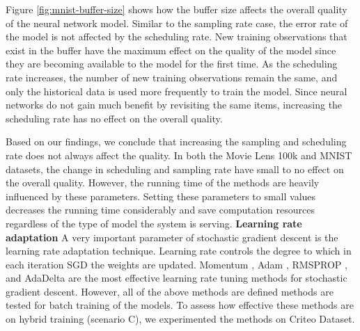 \documentclass[10pt,conference,letterpaper]{IEEEtran}
\begin{document}
Figure \ref{fig:mnist-buffer-size} shows how the buffer size affects the overall quality of the neural network model.
Similar to the sampling rate case, the error rate of the model is not affected by the scheduling rate.
New training observations that exist in the buffer have the maximum effect on the quality of the model since they are becoming available to the model for the first time.
As the scheduling rate increases, the number of new training observations remain the same, and only the historical data is used more frequently to train the model.
Since neural networks do not gain much benefit by revisiting the same items, increasing the scheduling rate has no effect on the overall quality.

Based on our findings, we conclude that increasing the sampling and scheduling rate does not always affect the quality.
In both the Movie Lens 100k and MNIST datasets, the change in scheduling and sampling rate have small to no effect on the overall quality.
However, the running time of the methods are heavily influenced by these parameters.
Setting these parameters to small values decreases the running time considerably and save computation resources regardless of the type of model the system is serving.
\textbf{Learning rate adaptation}
A very important parameter of stochastic gradient descent is the learning rate adaptation technique. 
Learning rate controls the degree to which in each iteration SGD the weights are updated.
Momentum \cite{qian1999momentum}, Adam \cite{kingma2014adam}, RMSPROP \cite{tieleman2012lecture}, and AdaDelta \cite{zeiler2012adaptive} are the most effective learning rate tuning methods for stochastic gradient descent. 
However, all of the above methods are defined methods are tested for batch training of the models.
To assess how effective these methods are on hybrid training (scenario C), we experimented the methods on Criteo Dataset.
\end{document}
